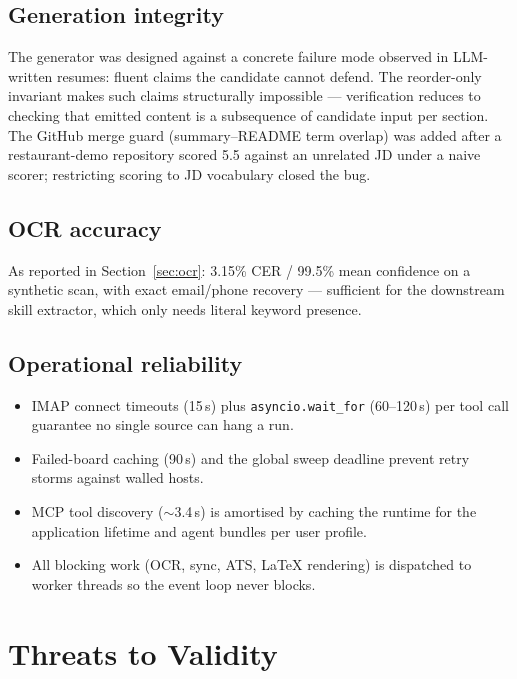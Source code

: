 \documentclass[11pt,a4paper]{article}
\newcommand{\code}[1]{\texttt{#1}}
\begin{document}
\subsection{Generation integrity}
The generator was designed against a concrete failure mode observed in
LLM-written resumes: fluent claims the candidate cannot defend. The
reorder-only invariant makes such claims structurally impossible ---
verification reduces to checking that emitted content is a subsequence of
candidate input per section. The GitHub merge guard (summary--README term
overlap) was added after a restaurant-demo repository scored 5.5 against an
unrelated JD under a naive scorer; restricting scoring to JD vocabulary
closed the bug.

\subsection{OCR accuracy}
As reported in Section~\ref{sec:ocr}: 3.15\% CER / 99.5\% mean confidence
on a synthetic scan, with exact email/phone recovery --- sufficient for the
downstream skill extractor, which only needs literal keyword presence.

\subsection{Operational reliability}
\begin{itemize}[leftmargin=2em]
  \item IMAP connect timeouts (15\,s) plus
        \code{asyncio.wait\_for} (60--120\,s) per tool call guarantee no
        single source can hang a run.
  \item Failed-board caching (90\,s) and the global sweep deadline prevent
        retry storms against walled hosts.
  \item MCP tool discovery ($\sim$3.4\,s) is amortised by caching the
        runtime for the application lifetime and agent bundles per user
        profile.
  \item All blocking work (OCR, sync, ATS, \LaTeX{} rendering) is
        dispatched to worker threads so the event loop never blocks.
\end{itemize}

\section{Threats to Validity}
\label{sec:threats}
\end{document}
